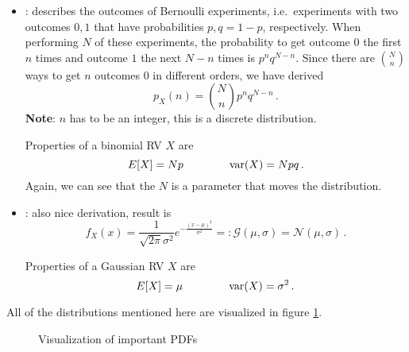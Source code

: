 \begin{ex}
\begin{itemize}
\item {}: describes the outcomes of Bernoulli experiments, i.e.~experiments with two outcomes $0, 1$ that have probabilities $p, q = 1 - p$, respectively. When performing $N$ of these experiments, the probability to get outcome $0$ the first $n$ times and outcome $1$ the next $N - n$ times is $p^n q^{N - n}$. Since there are $\binom{N}{n}$ ways to get $n$ outcomes $0$ in different orders, we have derived
\begin{equation}
p_X(n) = \binom{N}{n} p^n q^{N - n} \, .
\end{equation}
\textbf{Note}: $n$ has to be an integer, this is a discrete distribution.

Properties of a binomial RV $X$ are
\begin{equation}
E[X] = N p \qquad \qquad \operatorname{var}(X) = N p q \, .
\end{equation}
Again, we can see that the $N$ is a parameter that moves the distribution.


\item {}: also nice derivation, result is
\begin{equation}
f_X(x) = \frac{1}{\sqrt{2 \pi} \sigma^2} e^{- \frac{(x - \mu)^2}{\sigma^2}} =: \mathcal{G}(\mu, \sigma) = \mathcal{N}(\mu, \sigma) \, .
\end{equation}

Properties of a Gaussian RV $X$ are
\begin{equation}
E[X] = \mu \qquad \qquad \operatorname{var}(X) = \sigma^2 \, .
\end{equation}
\end{itemize}

All of the distributions mentioned here are visualized in figure \ref{fig:pdf_plots}.
\end{ex}



\begin{figure}
\centering

%
\hspace{0.04\textwidth}%
%


%
\hspace{0.04\textwidth}%
%




\caption{Visualization of important PDFs}
\label{fig:pdf_plots}
\end{figure}



